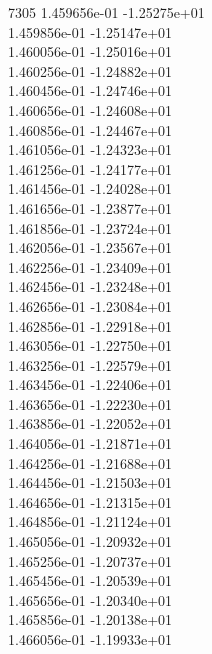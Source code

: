 7305	1.459656e-01	-1.25275e+01	\\ 	1.459856e-01	-1.25147e+01	\\ 	1.460056e-01	-1.25016e+01	\\ 	1.460256e-01	-1.24882e+01	\\ 	1.460456e-01	-1.24746e+01	\\ 	1.460656e-01	-1.24608e+01	\\ 	1.460856e-01	-1.24467e+01	\\ 	1.461056e-01	-1.24323e+01	\\ 	1.461256e-01	-1.24177e+01	\\ 	1.461456e-01	-1.24028e+01	\\ 	1.461656e-01	-1.23877e+01	\\ 	1.461856e-01	-1.23724e+01	\\ 	1.462056e-01	-1.23567e+01	\\ 	1.462256e-01	-1.23409e+01	\\ 	1.462456e-01	-1.23248e+01	\\ 	1.462656e-01	-1.23084e+01	\\ 	1.462856e-01	-1.22918e+01	\\ 	1.463056e-01	-1.22750e+01	\\ 	1.463256e-01	-1.22579e+01	\\ 	1.463456e-01	-1.22406e+01	\\ 	1.463656e-01	-1.22230e+01	\\ 	1.463856e-01	-1.22052e+01	\\ 	1.464056e-01	-1.21871e+01	\\ 	1.464256e-01	-1.21688e+01	\\ 	1.464456e-01	-1.21503e+01	\\ 	1.464656e-01	-1.21315e+01	\\ 	1.464856e-01	-1.21124e+01	\\ 	1.465056e-01	-1.20932e+01	\\ 	1.465256e-01	-1.20737e+01	\\ 	1.465456e-01	-1.20539e+01	\\ 	1.465656e-01	-1.20340e+01	\\ 	1.465856e-01	-1.20138e+01	\\ 	1.466056e-01	-1.19933e+01	\\ \hline
